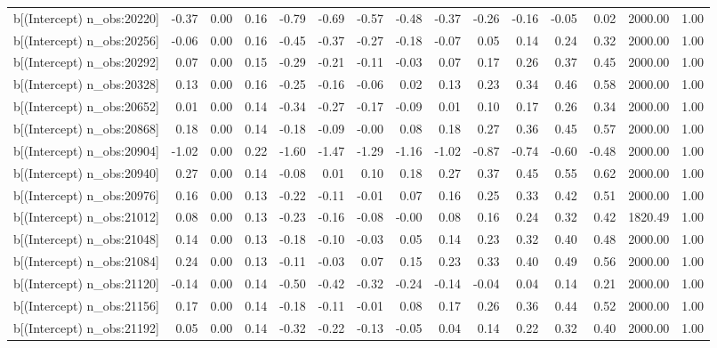 \begin{table}[ht]
\begin{tabular}{rrrrrrrrrrrrrrr}
  b[(Intercept) n\_obs:20220] & -0.37 & 0.00 & 0.16 & -0.79 & -0.69 & -0.57 & -0.48 & -0.37 & -0.26 & -0.16 & -0.05 & 0.02 & 2000.00 & 1.00 \\ 
  b[(Intercept) n\_obs:20256] & -0.06 & 0.00 & 0.16 & -0.45 & -0.37 & -0.27 & -0.18 & -0.07 & 0.05 & 0.14 & 0.24 & 0.32 & 2000.00 & 1.00 \\ 
  b[(Intercept) n\_obs:20292] & 0.07 & 0.00 & 0.15 & -0.29 & -0.21 & -0.11 & -0.03 & 0.07 & 0.17 & 0.26 & 0.37 & 0.45 & 2000.00 & 1.00 \\ 
  b[(Intercept) n\_obs:20328] & 0.13 & 0.00 & 0.16 & -0.25 & -0.16 & -0.06 & 0.02 & 0.13 & 0.23 & 0.34 & 0.46 & 0.58 & 2000.00 & 1.00 \\ 
  b[(Intercept) n\_obs:20652] & 0.01 & 0.00 & 0.14 & -0.34 & -0.27 & -0.17 & -0.09 & 0.01 & 0.10 & 0.17 & 0.26 & 0.34 & 2000.00 & 1.00 \\ 
  b[(Intercept) n\_obs:20868] & 0.18 & 0.00 & 0.14 & -0.18 & -0.09 & -0.00 & 0.08 & 0.18 & 0.27 & 0.36 & 0.45 & 0.57 & 2000.00 & 1.00 \\ 
  b[(Intercept) n\_obs:20904] & -1.02 & 0.00 & 0.22 & -1.60 & -1.47 & -1.29 & -1.16 & -1.02 & -0.87 & -0.74 & -0.60 & -0.48 & 2000.00 & 1.00 \\ 
  b[(Intercept) n\_obs:20940] & 0.27 & 0.00 & 0.14 & -0.08 & 0.01 & 0.10 & 0.18 & 0.27 & 0.37 & 0.45 & 0.55 & 0.62 & 2000.00 & 1.00 \\ 
  b[(Intercept) n\_obs:20976] & 0.16 & 0.00 & 0.13 & -0.22 & -0.11 & -0.01 & 0.07 & 0.16 & 0.25 & 0.33 & 0.42 & 0.51 & 2000.00 & 1.00 \\ 
  b[(Intercept) n\_obs:21012] & 0.08 & 0.00 & 0.13 & -0.23 & -0.16 & -0.08 & -0.00 & 0.08 & 0.16 & 0.24 & 0.32 & 0.42 & 1820.49 & 1.00 \\ 
  b[(Intercept) n\_obs:21048] & 0.14 & 0.00 & 0.13 & -0.18 & -0.10 & -0.03 & 0.05 & 0.14 & 0.23 & 0.32 & 0.40 & 0.48 & 2000.00 & 1.00 \\ 
  b[(Intercept) n\_obs:21084] & 0.24 & 0.00 & 0.13 & -0.11 & -0.03 & 0.07 & 0.15 & 0.23 & 0.33 & 0.40 & 0.49 & 0.56 & 2000.00 & 1.00 \\ 
  b[(Intercept) n\_obs:21120] & -0.14 & 0.00 & 0.14 & -0.50 & -0.42 & -0.32 & -0.24 & -0.14 & -0.04 & 0.04 & 0.14 & 0.21 & 2000.00 & 1.00 \\ 
  b[(Intercept) n\_obs:21156] & 0.17 & 0.00 & 0.14 & -0.18 & -0.11 & -0.01 & 0.08 & 0.17 & 0.26 & 0.36 & 0.44 & 0.52 & 2000.00 & 1.00 \\ 
  b[(Intercept) n\_obs:21192] & 0.05 & 0.00 & 0.14 & -0.32 & -0.22 & -0.13 & -0.05 & 0.04 & 0.14 & 0.22 & 0.32 & 0.40 & 2000.00 & 1.00 \\ 

\end{tabular}
\end{table}
